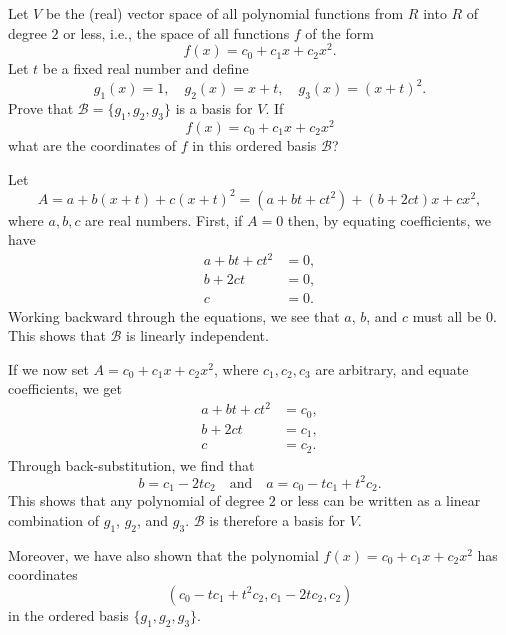  Let $V$ be the (real) vector space of all polynomial
functions from $R$ into $R$ of degree $2$ or less, i.e., the space of
all functions $f$ of the form
\begin{equation*}
  f(x) = c_0 + c_1x + c_2x^2.
\end{equation*}
Let $t$ be a fixed real number and define
\begin{equation*}
  g_1(x) = 1, \quad
  g_2(x) = x + t, \quad
  g_3(x) = (x + t)^2.
\end{equation*}
Prove that $\mathcal{B} = \{g_1,g_2,g_3\}$ is a basis for $V$. If
\begin{equation*}
  f(x) = c_0 + c_1x + c_2x^2
\end{equation*}
what are the coordinates of $f$ in this ordered basis $\mathcal{B}$?
\begin{solution}
  Let
  \begin{equation*}
    A = a + b(x + t) + c(x + t)^2
    = (a + bt + ct^2) + (b + 2ct)x + cx^2,
  \end{equation*}
  where $a,b,c$ are real numbers. First, if $A = 0$ then, by equating
  coefficients, we have
  \begin{align*}
    a + bt + ct^2 &= 0, \\
    b + 2ct &= 0, \\
    c &= 0.
  \end{align*}
  Working backward through the equations, we see that $a$, $b$, and
  $c$ must all be $0$. This shows that $\mathcal{B}$ is linearly
  independent.

  If we now set $A = c_0 + c_1x + c_2x^2$, where $c_1,c_2,c_3$ are
  arbitrary, and equate coefficients, we get
  \begin{align*}
    a + bt + ct^2 &= c_0, \\
    b + 2ct &= c_1, \\
    c &= c_2.
  \end{align*}
  Through back-substitution, we find that
  \begin{equation*}
    b = c_1 - 2tc_2 \quad\text{and}\quad
    a = c_0 - tc_1 + t^2c_2.
  \end{equation*}
  This shows that any polynomial of degree $2$ or less can be written
  as a linear combination of $g_1$, $g_2$, and $g_3$. $\mathcal{B}$ is
  therefore a basis for $V$.

  Moreover, we have also shown that the polynomial
  $f(x) = c_0 + c_1x + c_2x^2$ has coordinates
  \begin{equation*}
    (c_0 - tc_1 + t^2c_2, c_1 - 2tc_2, c_2)
  \end{equation*}
  in the ordered basis $\{g_1,g_2,g_3\}$.
\end{solution}
